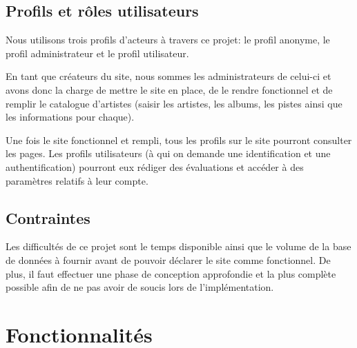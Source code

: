     \subsection{Profils et rôles utilisateurs}

        \begin{paragraphe}
            Nous utilisons trois profils d’acteurs à travers ce projet: le profil
            anonyme, le profil administrateur et le profil utilisateur.
        \end{paragraphe}

        \begin{paragraphe}
            En tant que créateurs du site, nous sommes les administrateurs de celui-ci
            et avons donc la charge de mettre le site en place, de le rendre
            fonctionnel et de remplir le catalogue d'artistes (saisir les artistes, les
            albums, les pistes ainsi que les informations pour chaque).
        \end{paragraphe}

        \begin{paragraphe}
            Une fois le site fonctionnel et rempli, tous les profils sur le site pourront 
            consulter les pages.
            Les profils utilisateurs (à qui on demande une identification et une authentification) 
            pourront eux rédiger des évaluations et accéder à des paramètres relatifs à leur compte.
        \end{paragraphe}

    \subsection{Contraintes}

        \begin{paragraphe}
            Les difficultés de ce projet sont le temps disponible ainsi que le volume
            de la base de données à fournir avant de pouvoir déclarer le site comme
            fonctionnel. De plus, il faut effectuer une phase de conception approfondie et la 
            plus complète possible afin de ne pas avoir de soucis lors de l'implémentation.
        \end{paragraphe}
        
\newpage

\section{Fonctionnalités}

